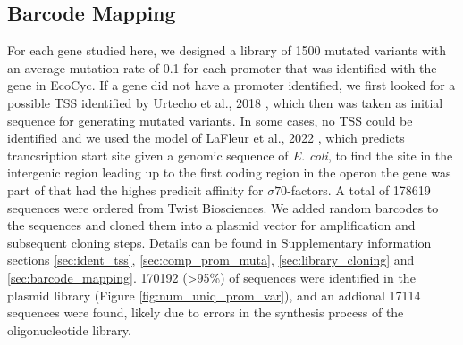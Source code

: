 \subsection{Barcode Mapping}
For each gene studied here, we designed a library of 1500 mutated variants with an average mutation rate of 0.1 for each promoter that was identified with the gene in EcoCyc. If a gene did not have a promoter identified, we first looked for a possible TSS identified by Urtecho et al., 2018 \cite{urtecho2018systematic}, which then was taken as initial sequence for generating mutated variants. In some cases, no TSS could be identified and we used the model of LaFleur et al., 2022 \cite{lafleur2022automated}, which predicts trancsription start site given a genomic sequence of \textit{E. coli}, to find the site in the intergenic region leading up to the first coding region in the operon the gene was part of that had the highes predicit affinity for $\sigma70$-factors. A total of 178619 sequences were ordered from Twist Biosciences. We added random barcodes to the sequences and cloned them into a plasmid vector for amplification and subsequent cloning steps. Details can be found in Supplementary information sections \ref{sec:ident_tss}, \ref{sec:comp_prom_muta}, \ref{sec:library_cloning} and  \ref{sec:barcode_mapping}. 170192 (>95\%) of sequences were identified in the plasmid library (Figure \ref{fig:num_uniq_prom_var}), and an addional 17114 sequences were found, likely due to errors in the synthesis process of the oligonucleotide library. 


